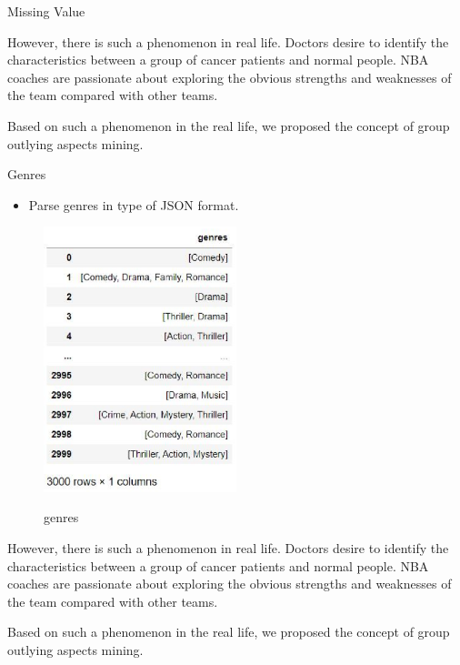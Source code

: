 \documentclass[
 size=12pt,
 paper=smartboard,  %
 mode=present, 		%
 display=slides, 	%
 style=tuliplab,  	%
 pauseslide,
 fleqn,leqno]{powerdot}
\begin{document}
\begin{slide}{Missing Value}
\begin{note}
However,
there is such a phenomenon in real life.
Doctors desire to identify the characteristics between
a group of cancer patients and normal people.
NBA coaches are passionate about exploring the obvious strengths and
weaknesses of the team compared with other teams.

Based on such a phenomenon in the real life,
we proposed the concept of group outlying aspects mining.
\end{note}

\end{slide}
\begin{slide}{Genres}
  \begin{itemize}
    \item
    Parse genres in type of JSON format. 
  \end{itemize}
  \begin{figure}[htbp]
    \centering
    \includegraphics[width=0.5\textwidth,height=0.48\textwidth]{figures/genres.eps}\\
    \caption{genres}
  \end{figure}

\begin{note}
However,
there is such a phenomenon in real life.
Doctors desire to identify the characteristics between
a group of cancer patients and normal people.
NBA coaches are passionate about exploring the obvious strengths and
weaknesses of the team compared with other teams.

Based on such a phenomenon in the real life,
we proposed the concept of group outlying aspects mining.
\end{note}

\end{slide}
\end{document}
